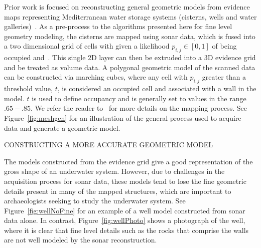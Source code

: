 \documentclass[twocolumn]{article}
\makeatletter
\def\section{\@startsection{section}{1}{\z@}{24pt plus 2 pt
minus 2 pt} {12pt plus 2pt minus 2pt}{\large\bf}}
\makeatother
\begin{document}
\noindent Prior work is focused on reconstructing general geometric models from evidence maps representing Mediterranean water storage systems (cisterns, wells and water galleries)~\cite{ICEX11,McVicker,McVicker2}.  As a pre-process to the algorithms presented here for fine level geometry modeling, the cisterns are mapped using sonar data, which is fused into a two dimensional grid of cells with given a likelihood $p_{i,j} \in [0,1]$ of being occupied \cite{Thrun2005} and~\cite{White10}. This single 2D layer can then be extruded into a 3D evidence grid and be treated as volume data.  A polygonal geometric model of the scanned data can be constructed via marching cubes, where any cell with $p_{i,j}$ greater than a threshold value, $t$, is considered an occupied cell and associated with a wall in the model. $t$ is used to define occupancy and is generally set to values in the range $.65-.85$. We refer the reader to~\cite{ICEX11,McVicker,McVicker2} for more details on the mapping process. See Figure~\ref{fig:meshgen} for an illustration of the general process used to acquire data and generate a geometric model.

\section{\uppercase{Constructing a more accurate geometric model}}
\label{sec:detail}

\noindent The models constructed from the evidence grid give a good representation of the gross shape of an underwater system. However, due to challenges in the acquisition process for sonar data, these models tend to lose the fine geometric details present in many of the mapped structures, which are important to archaeologists seeking to study the underwater system. See Figure~\ref{fig:wellNoFine} for an example of a well model constructed from sonar data alone. In contrast, Figure~\ref{fig:wellPhoto} shows a photograph of the well, where it is clear that fine level details such as the rocks that comprise the walls are not well modeled by the sonar reconstruction.
\end{document}
